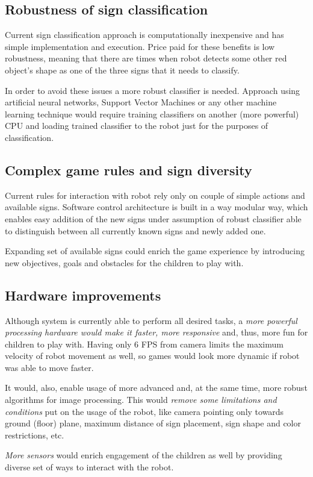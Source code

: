 
\subsection{Robustness of sign classification}

Current sign classification approach is computationally inexpensive and has simple implementation and execution. Price paid for these benefits is low robustness, meaning that there are times when robot detects some other red object's shape as one of the three signs that it needs to classify.

In order to avoid these issues a more robust classifier is needed. Approach using artificial neural networks, Support Vector Machines or any other machine learning technique would require training classifiers on another (more powerful) CPU and loading trained classifier to the robot just for the purposes of classification.

\subsection{Complex game rules and sign diversity}

Current rules for interaction with robot rely only on couple of simple actions and available signs. Software control architecture is built in a way modular way, which enables easy addition of the new signs under assumption of robust classifier able to distinguish between all currently known signs and newly added one.

Expanding set of available signs could enrich the game experience by introducing new objectives, goals and obstacles for the children to play with.

\subsection{Hardware improvements}

Although system is currently able to perform all desired tasks, a \textit{more powerful processing hardware would make it faster, more responsive} and, thus, more fun for children to play with. Having only 6 FPS from camera limits the maximum velocity of robot movement as well, so games would look more dynamic if robot was able to move faster. 

It would, also, enable usage of more advanced and, at the same time, more robust algorithms for image processing. This would \textit{remove some limitations and conditions} put on the usage of the robot, like camera pointing only towards ground (floor) plane, maximum distance of sign placement, sign shape and color restrictions, etc.

\textit{More sensors} would enrich engagement of the children as well by providing diverse set of ways to interact with the robot. 


